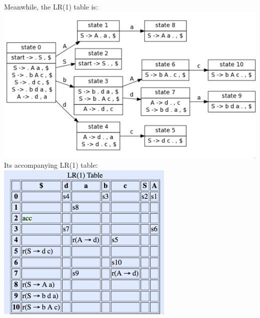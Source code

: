 \documentclass[12pt]{article}
\begin{document}
\begin{itemize}
    Meanwhile, the LR(1) table is:\\
    \includegraphics[scale=0.5]{lr1falsetable.png}\\
    Its accompanying LR(1) table:\\
    \includegraphics[scale=0.5]{lr1table.png}
\end{itemize}
\end{document}
